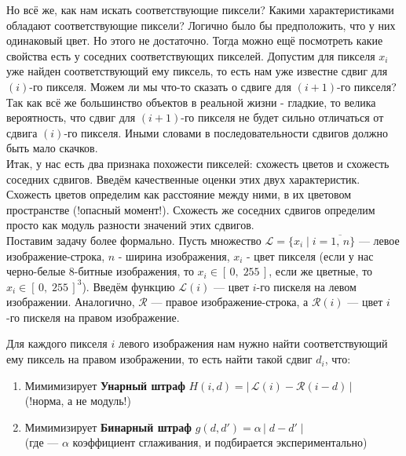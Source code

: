 	Но всё же, как нам искать соответствующие пиксели? Какими характеристиками обладают соответствующие пиксели? Логично было бы предположить, что у них одинаковый цвет. Но этого не достаточно. Тогда можно ещё посмотреть какие свойства есть у соседних соответствующих пикселей. Допустим для пикселя $x_{i}$ уже найден соответствующий ему пиксель, то есть нам уже известне сдвиг для $(i)$-го пикселя. Можем ли мы что-то сказать о сдвиге для $(i+1)$-го пикселя? Так как всё же большинство объектов в реальной жизни - гладкие, то велика вероятность, что сдвиг для $(i+1)$-го пикселя не будет сильно отличаться от сдвига $(i)$-го пикселя. Иными словами в последовательности сдвигов должно быть мало скачков.\\
	
	Итак, у нас есть два признака похожести пикселей: схожесть цветов и схожесть соседних сдвигов. Введём качественные оценки этих двух характеристик. Схожесть цветов определим как расстояние между ними, в их цветовом пространстве (!опасный момент!). Схожесть же соседних сдвигов определим просто как модуль разности значений этих сдвигов.\\
	
	Поставим задачу более формально. Пусть множество 
	$\mathcal{L} = \{x_i \; | \; i = \overline{1,\, n}\}$ --- левое изображение-строка, $n$ - ширина изображения, $x_i$ - цвет пикселя (если у нас черно-белые 8-битные изображения, то $x_i \in [ \, 0, \; 255 \,]$, если же цветные, то $x_i \in {[ \, 0, \; 255 \,]}^3$). Введём функцию $\mathcal{L}(i)$ --- цвет $i$-го пискеля на левом изображении. Аналогично, $\mathcal{R}$ --- правое изображение-строка, а $\mathcal{R}(i)$ --- цвет $i$-го пискеля на правом изображение.
	
	Для каждого пикселя $i$ левого изображения нам нужно найти соответствующий ему пиксель на правом изображении, то есть найти такой сдвиг $d_i$, что:
	\begin{enumerate}
	
	\item Мимимизирует \textbf{Унарный штраф} $H(i, d) = | \, \mathcal{L}(i)- \mathcal{R}(i - d) \, |$\\
	(!норма, а не модуль!)
	
	\item Мимимизирует \textbf{Бинарный штраф} $g(d, d') = \alpha \, | \; d - d' \; |$ \\
	(где  --- $\alpha$ коэффициент сглаживания, и подбирается экспериментально)
	
	\end{enumerate}
	
